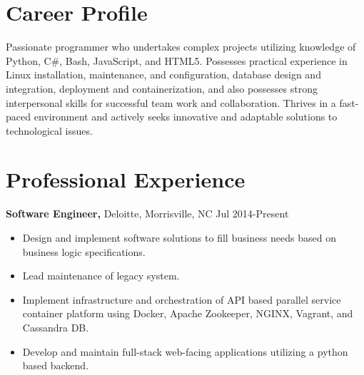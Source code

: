 \documentclass{res}
\begin{document}
 
 
\address{{\bf Present Address} \\ 906 Belhaven Rd. \\ Cary, NC 27513  \\
        (336) 681-7224 }
\address{{\bf Permanent Address} \\ 114 East Keeling Rd \\ Greensborbo, NC 27410 \\
        (336) 299-7703 }
 
\begin{resume} 

\noindent\makebox[5in]{\rule{6in}{0.4pt}}


\section{Career Profile} 
Passionate programmer who undertakes complex projects utilizing knowledge of Python, C\#, Bash, JavaScript, and HTML5. Possesses practical experience in Linux installation, maintenance, and configuration, database design and integration, deployment and containerization, and also possesses strong interpersonal skills for successful team work and collaboration. Thrives in a fast-paced environment and actively seeks innovative and adaptable solutions to technological issues.

\section{Professional Experience}
  {\bf Software Engineer,} Deloitte, Morrisville, NC \hfill Jul 2014-Present
    \begin{itemize} \itemsep -2pt
     \item Design and implement software solutions to fill business needs based on business logic specifications.
     \item Lead maintenance of legacy system.
     \item Implement infrastructure and orchestration of API based parallel service container platform using Docker, Apache Zookeeper, NGINX, Vagrant, and Cassandra DB.
     \item Develop and maintain full-stack web-facing applications utilizing a python based backend.
     \end{itemize}
  

\end{resume}
\end{document}
